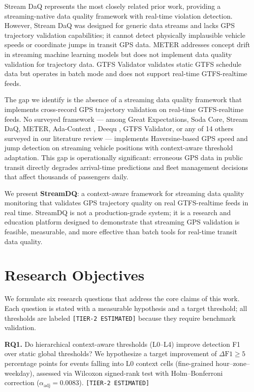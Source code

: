 Stream DaQ \citep{streamdaq2025} represents the most closely related prior work,
providing a streaming-native data quality framework with real-time violation
detection. However, Stream DaQ was designed for generic data streams and lacks
GPS trajectory validation capabilities; it cannot detect physically implausible
vehicle speeds or coordinate jumps in transit GPS data. METER \citep{meter2024}
addresses concept drift in streaming machine learning models but does not implement
data quality validation for trajectory data. GTFS Validator \citep{gtfs_validator}
validates static GTFS schedule data but operates in batch mode and does not
support real-time GTFS-realtime feeds.

The gap we identify is the absence of a streaming data quality framework that
implements cross-record GPS trajectory validation on real-time GTFS-realtime
feeds. No surveyed framework — among Great Expectations, Soda Core, Stream DaQ,
METER, Ada-Context \citep{adacontext2025}, Deequ \citep{deequ2018}, GTFS Validator,
or any of 14 others surveyed in our literature review — implements Haversine-based
GPS speed and jump detection on streaming vehicle positions with context-aware
threshold adaptation. This gap is operationally significant: erroneous GPS data
in public transit directly degrades arrival-time predictions and fleet management
decisions that affect thousands of passengers daily.

We present \textbf{StreamDQ}: a context-aware framework for streaming data quality
monitoring that validates GPS trajectory quality on real GTFS-realtime feeds in
real time. StreamDQ is not a production-grade system; it is a research and
education platform designed to demonstrate that streaming GPS validation is feasible,
measurable, and more effective than batch tools for real-time transit data quality.

\section{Research Objectives}
\label{sec:intro-objectives}

We formulate six research questions that address the core claims of this work.
Each question is stated with a measurable hypothesis and a target threshold;
all thresholds are labeled \texttt{[TIER-2\ ESTIMATED]} because they require
benchmark validation.

\textbf{RQ1.} Do hierarchical context-aware thresholds (L0--L4) improve detection F1
over static global thresholds? We hypothesize a target improvement of
$\Delta\text{F1} \geq 5$ percentage points for events falling into L0 context
cells (fine-grained hour--zone--weekday), assessed via Wilcoxon signed-rank test
with Holm--Bonferroni correction ($\alpha_{\text{adj}} = 0.0083$).
\texttt{[TIER-2\ ESTIMATED]}

